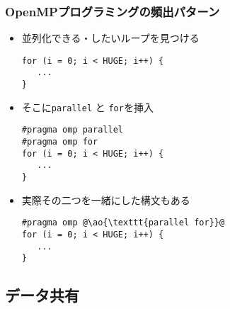 \documentclass[10pt,dvipdfmx]{beamer}
\newcommand{\ao}[1]{{\color{blue}#1}}
\begin{document}
\begin{frame}[fragile]
\frametitle{OpenMPプログラミングの頻出パターン}
\begin{itemize}
\item 並列化できる・したいループを見つける
\begin{lstlisting}
for (i = 0; i < HUGE; i++) {
   ...    
}      
\end{lstlisting}
\item そこに\texttt{parallel} と \texttt{for}を挿入
\begin{lstlisting}
#pragma omp parallel
#pragma omp for
for (i = 0; i < HUGE; i++) {
   ...    
}      
\end{lstlisting}

\item 実際その二つを一緒にした構文もある
\begin{lstlisting}
#pragma omp @\ao{\texttt{parallel for}}@
for (i = 0; i < HUGE; i++) {
   ...    
}      
\end{lstlisting}
\end{itemize}
\end{frame}

\iffalse
\begin{frame}[fragile]
\frametitle{Parallelizing loop nests by \ao{\tt collapse}}
\begin{itemize}
\item \ao{\tt collapse($l$)} can be used to partition nested loops. e.g.,
\begin{lstlisting}
#pragma omp for @\ao{collapse(2)}@
for (i = 0; i < n; i++)
  for (j = 0; j < n; j++)
    @$S$@
\end{lstlisting}
will partition $n^2$ iterations of the doubly-nested loop
\item {\tt schedule} clause applies to nested loops as if 
  the nested loop is an equivalent flat loop
\item restriction: the loop must be \ao{\em ``perfectly nested''}
  (the iteration space must be a rectangular and no intervening
  statement between different levels of the nest)
\end{itemize}
\end{frame}
\fi

\subsection{データ共有}
\end{document}
